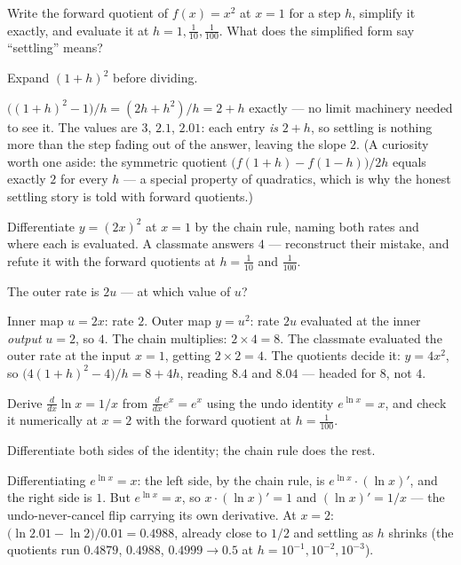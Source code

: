 \begin{problem}
Write the forward quotient of $f(x) = x^2$ at $x = 1$ for a step
$h$, simplify it exactly, and evaluate it at $h = 1, \tfrac{1}{10},
\tfrac{1}{100}$. What does the simplified form say ``settling''
means?
\begin{hint}
Expand $(1+h)^2$ before dividing.
\end{hint}
\begin{solution}
$\bigl((1+h)^2 - 1\bigr)/h = (2h + h^2)/h = 2 + h$ exactly — no
limit machinery needed to see it. The values are $3$, $2.1$,
$2.01$: each entry \emph{is} $2 + h$, so settling is nothing more
than the step fading out of the answer, leaving the slope $2$. (A
curiosity worth one aside: the symmetric quotient
$\bigl(f(1+h) - f(1-h)\bigr)/2h$ equals exactly $2$ for every $h$ —
a special property of quadratics, which is why the honest settling
story is told with forward quotients.)
\end{solution}
\end{problem}

\begin{problem}
Differentiate $y = (2x)^2$ at $x = 1$ by the chain rule, naming both
rates and where each is evaluated. A classmate answers $4$ —
reconstruct their mistake, and refute it with the forward quotients
at $h = \tfrac{1}{10}$ and $\tfrac{1}{100}$.
\begin{hint}
The outer rate is $2u$ — at which value of $u$?
\end{hint}
\begin{solution}
Inner map $u = 2x$: rate $2$. Outer map $y = u^2$: rate $2u$
evaluated at the inner \emph{output} $u = 2$, so $4$. The chain
multiplies: $2 \times 4 = 8$. The classmate evaluated the outer rate
at the input $x = 1$, getting $2 \times 2 = 4$. The quotients decide
it: $y = 4x^2$, so
$\bigl(4(1+h)^2 - 4\bigr)/h = 8 + 4h$, reading $8.4$ and $8.04$ —
headed for $8$, not $4$.
\end{solution}
\end{problem}

\begin{problem}
Derive $\frac{d}{dx} \ln x = 1/x$ from $\frac{d}{dx} e^x = e^x$ using
the undo identity $e^{\ln x} = x$, and check it numerically at
$x = 2$ with the forward quotient at $h = \tfrac{1}{100}$.
\begin{hint}
Differentiate both sides of the identity; the chain rule does the
rest.
\end{hint}
\begin{solution}
Differentiating $e^{\ln x} = x$: the left side, by the chain rule,
is $e^{\ln x} \cdot (\ln x)'$, and the right side is $1$. But
$e^{\ln x} = x$, so $x \cdot (\ln x)' = 1$ and $(\ln x)' = 1/x$ —
the undo-never-cancel flip carrying its own derivative. At $x = 2$:
$\bigl(\ln 2.01 - \ln 2\bigr)/0.01 = 0.4988$, already close to $1/2$
and settling as $h$ shrinks (the quotients run $0.4879$, $0.4988$,
$0.4999 \to 0.5$ at $h = 10^{-1}, 10^{-2}, 10^{-3}$).
\end{solution}
\end{problem}

